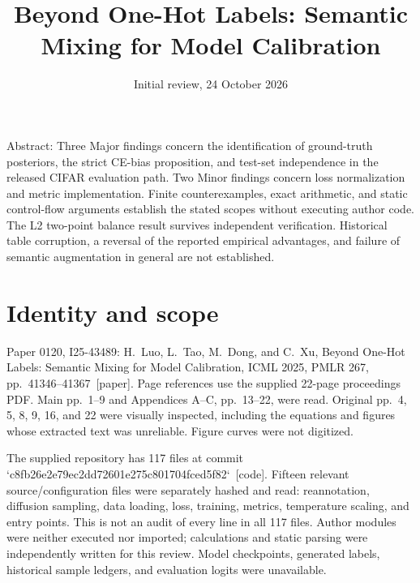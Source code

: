 \documentclass[10pt]{article}
\title{Beyond One-Hot Labels: Semantic Mixing for Model Calibration}
\author{}
\date{Initial review, 24 October 2026}
\begin{document}
\maketitle
Abstract: Three Major findings concern the identification of ground-truth posteriors, the strict CE-bias proposition, and test-set independence in the released CIFAR evaluation path. Two Minor findings concern loss normalization and metric implementation. Finite counterexamples, exact arithmetic, and static control-flow arguments establish the stated scopes without executing author code. The L2 two-point balance result survives independent verification. Historical table corruption, a reversal of the reported empirical advantages, and failure of semantic augmentation in general are not established.\par
\section*{Identity and scope}
Paper 0120, I25-43489: H. Luo, L. Tao, M. Dong, and C. Xu, Beyond One-Hot Labels: Semantic Mixing for Model Calibration, ICML 2025, PMLR 267, pp. 41346–41367 [paper]. Page references use the supplied 22-page proceedings PDF. Main pp. 1–9 and Appendices A–C, pp. 13–22, were read. Original pp. 4, 5, 8, 9, 16, and 22 were visually inspected, including the equations and figures whose extracted text was unreliable. Figure curves were not digitized.\par
The supplied repository has 117 files at commit `c8fb26e2e79ec2dd72601e275c801704fced5f82` [code]. Fifteen relevant source/configuration files were separately hashed and read: reannotation, diffusion sampling, data loading, loss, training, metrics, temperature scaling, and entry points. This is not an audit of every line in all 117 files. Author modules were neither executed nor imported; calculations and static parsing were independently written for this review. Model checkpoints, generated labels, historical sample ledgers, and evaluation logits were unavailable.\par
\end{document}

